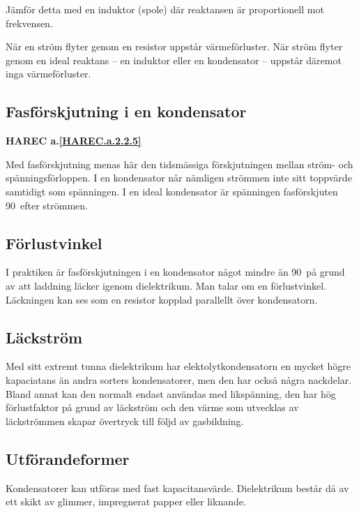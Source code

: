Jämför detta med en induktor (spole) där reaktansen är proportionell mot frekvensen.

När en ström flyter genom en resistor uppstår värmeförluster. När ström flyter genom 
en ideal reaktans -- en induktor eller en kondensator -- uppstår däremot inga 
värmeförluster.

\subsection{Fasförskjutning i en kondensator}
\textbf{HAREC a.\ref{HAREC.a.2.2.5}\label{myHAREC.a.2.2.5}}

Med fasförskjutning menas här den tidsmässiga förskjutningen mellan ström- och
spänningsförloppen. I en kondensator når nämligen strömmen inte sitt toppvärde
samtidigt som spänningen.
I en ideal kondensator är spänningen fasförskjuten 90\degree~efter strömmen.

\subsection{Förlustvinkel}

I praktiken är fasförskjutningen i en kondensator något mindre än 90\degree~på
grund av att laddning läcker igenom dielektrikum. Man talar om en förlustvinkel.
Läckningen kan ses som en resistor kopplad parallellt över kondensatorn.

\subsection{Läckström}

Med sitt extremt tunna dielektrikum har elektolytkondensatorn en mycket högre
kapaciatans än andra sorters kondensatorer, men den har också några nackdelar.  
Bland annat kan den normalt endast användas med likspänning, den har hög 
förlustfaktor på grund av läckström och den värme som utvecklas av läckströmmen 
skapar övertryck till följd av gasbildning.

\subsection{Utförandeformer}

Kondensatorer kan utföras med fast kapacitansvärde.
Dielektrikum består då av ett skikt av glimmer, impregnerat papper eller liknande.

